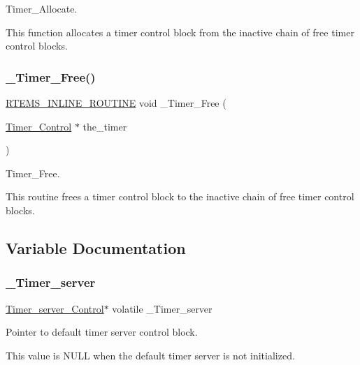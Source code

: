 Timer\+\_\+\+Allocate. 

This function allocates a timer control block from the inactive chain of free timer control blocks. \mbox{\label{group__ClassicTimerImpl_gac8b9418437bbd28ed3d1c81093cb9ec8}} 
\subsubsection{\texorpdfstring{\_Timer\_Free()}{\_Timer\_Free()}}
{\footnotesize\ttfamily \mbox{\hyperlink{group__RTEMSScoreBaseDefs_gac216239df231d5dbd15e3520b0b9313f}{R\+T\+E\+M\+S\+\_\+\+I\+N\+L\+I\+N\+E\+\_\+\+R\+O\+U\+T\+I\+NE}} void \+\_\+\+Timer\+\_\+\+Free (\begin{DoxyParamCaption}\item[{\mbox{\hyperlink{structTimer__Control}{Timer\+\_\+\+Control}} $\ast$}]{the\+\_\+timer }\end{DoxyParamCaption})}



Timer\+\_\+\+Free. 

This routine frees a timer control block to the inactive chain of free timer control blocks. 

\subsection{Variable Documentation}
\mbox{\label{group__ClassicTimerImpl_ga22a1cf7a5c39d7c8ea2ec3764ddb88fa}} 
\subsubsection{\texorpdfstring{\_Timer\_server}{\_Timer\_server}}
{\footnotesize\ttfamily \mbox{\hyperlink{structTimer__server__Control}{Timer\+\_\+server\+\_\+\+Control}}$\ast$ volatile \+\_\+\+Timer\+\_\+server}



Pointer to default timer server control block. 

This value is {\ttfamily N\+U\+LL} when the default timer server is not initialized. 